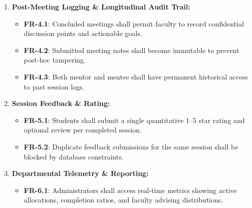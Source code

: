 \documentclass[11pt,a4paper]{article}
\begin{document}
\begin{enumerate}[label=\textbf{FR-\arabic*}, leftmargin=2.5em, itemsep=0.3em]
\begin{itemize}[itemsep=0.1em]
    \item \textbf{FR-3.4}: Cancellations requested at least 2 hours before the start time shall reset the slot to open status.
  \end{itemize}
  \item \textbf{Post-Meeting Logging \& Longitudinal Audit Trail:}
  \begin{itemize}[itemsep=0.1em]
    \item \textbf{FR-4.1}: Concluded meetings shall permit faculty to record confidential discussion points and actionable goals.
    \item \textbf{FR-4.2}: Submitted meeting notes shall become immutable to prevent post-hoc tampering.
    \item \textbf{FR-4.3}: Both mentor and mentee shall have permanent historical access to past session logs.
  \end{itemize}
  \item \textbf{Session Feedback \& Rating:}
  \begin{itemize}[itemsep=0.1em]
    \item \textbf{FR-5.1}: Students shall submit a single quantitative 1--5 star rating and optional review per completed session.
    \item \textbf{FR-5.2}: Duplicate feedback submissions for the same session shall be blocked by database constraints.
  \end{itemize}
  \item \textbf{Departmental Telemetry \& Reporting:}
  \begin{itemize}[itemsep=0.1em]
    \item \textbf{FR-6.1}: Administrators shall access real-time metrics showing active allocations, completion ratios, and faculty advising distributions.
  \end{itemize}
\end{enumerate}
\end{document}
